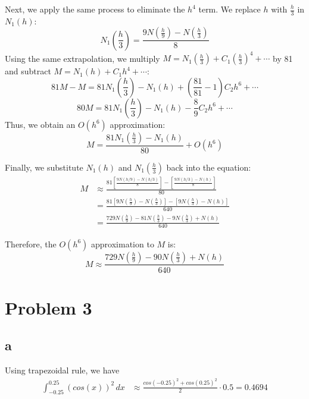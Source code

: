 \documentclass[11pt,a4paper]{report}
\theoremstyle{remark}
\begin{document}
Next, we apply the same process to eliminate the \(h^4\) term. We replace \(h\) with \(\frac{h}{3}\) in \(N_1(h)\):
\begin{equation}
N_1\left(\frac{h}{3}\right) = \frac{9N(\frac{h}{9}) - N(\frac{h}{3})}{8}
\end{equation}
Using the same extrapolation, we multiply \(M = N_1(\frac{h}{3}) + C_1 (\frac{h}{3})^4 + \cdots\) by 81 and subtract \(M = N_1(h) + C_1 h^4 + \cdots\):
\begin{equation}
81M - M = 81N_1\left(\frac{h}{3}\right) - N_1(h) + \left(\frac{81}{81} - 1\right)C_2 h^6 + \cdots
\end{equation}
\begin{equation}
80M = 81N_1\left(\frac{h}{3}\right) - N_1(h) - \frac{8}{9}C_2 h^6 + \cdots
\end{equation}
Thus, we obtain an \(O(h^6)\) approximation:
\begin{equation}
M = \frac{81N_1(\frac{h}{3}) - N_1(h)}{80} + O(h^6)
\end{equation}

Finally, we substitute \(N_1(h)\) and \(N_1(\frac{h}{3})\) back into the equation:
\begin{align}
M &\approx \frac{81 \left[ \frac{9N(h/9) - N(h/3)}{8} \right] - \left[ \frac{9N(h/3) - N(h)}{8} \right]}{80} \nonumber \\
  &= \frac{81 \left[ 9N(\frac{h}{9}) - N(\frac{h}{3}) \right] - \left[ 9N(\frac{h}{3}) - N(h) \right]}{640} \nonumber \\
  &= \frac{729N(\frac{h}{9}) - 81N(\frac{h}{3}) - 9N(\frac{h}{3}) + N(h)}{640}
\end{align}

Therefore, the \(O(h^6)\) approximation to \(M\) is:
\begin{equation}
M \approx \frac{729N(\frac{h}{9}) - 90N(\frac{h}{3}) + N(h)}{640}
\end{equation}
\section*{Problem 3}
\subsection*{a}
Using trapezoidal rule, we have
\begin{align*}
  \int_{-0.25}^{0.25} (cos(x))^2 \,dx &\approx \frac{cos(-0.25)^2 + cos(0.25)^2}{2} \cdot 0.5 = 0.4694
\end{align*}
\end{document}
